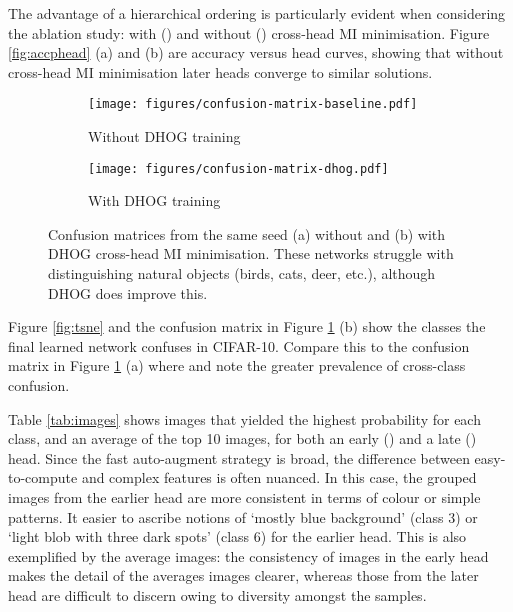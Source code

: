 \documentclass[runningheads]{llncs}
\begin{document}
The advantage of a hierarchical ordering is particularly evident when considering the ablation study: with () and without () cross-head MI minimisation. Figure \ref{fig:accphead} (a) and (b) are accuracy versus head curves, showing that without cross-head MI minimisation later heads converge to similar solutions. 


\begin{figure}[!htb]
\begin{center}
\begin{subfigure}{0.49\textwidth}
\texttt{[image: figures/confusion-matrix-baseline.pdf]}
\caption{Without DHOG training}
\end{subfigure}
\begin{subfigure}{0.49\textwidth}
\texttt{[image: figures/confusion-matrix-dhog.pdf]}
\caption{With DHOG training}
\end{subfigure}
\end{center}
  \caption{Confusion matrices from the same seed (a) without and (b) with DHOG cross-head MI minimisation. These networks struggle with distinguishing natural objects (birds, cats, deer, etc.), although DHOG does improve this.
\label{fig:confusion} \vspace{-3mm}}

\end{figure}

Figure \ref{fig:tsne} and the confusion matrix in Figure \ref{fig:confusion} (b) show the classes the final learned network confuses in CIFAR-10. Compare this to the confusion matrix in Figure \ref{fig:confusion} (a) where  and note the greater prevalence of cross-class confusion. 

Table \ref{tab:images} shows images that yielded the highest probability for each class, and an average of the top 10 images, for both an early () and a late () head. Since the fast auto-augment strategy is broad, the difference between easy-to-compute and complex features is often nuanced. In this case, the grouped images from the earlier head are more consistent in terms of colour or simple patterns. It easier to ascribe notions of `mostly blue background' (class 3) or `light blob with three dark spots' (class 6) for the earlier head. This is also exemplified by the average images: the consistency of images in the early head makes the detail of the averages images clearer, whereas those from the later head are difficult to discern owing to diversity amongst the samples. 
\end{document}
